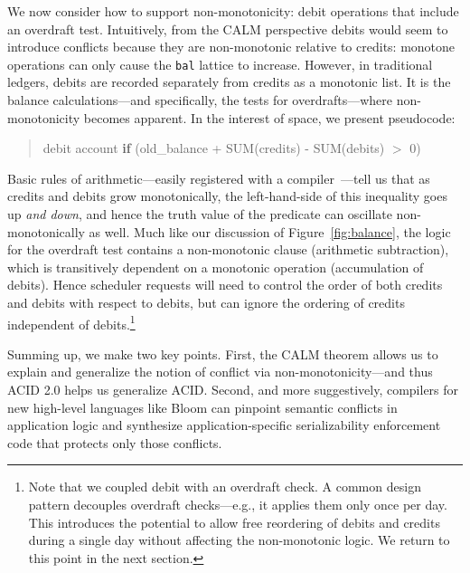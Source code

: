 \documentclass{sig-alternate}
\begin{document}
We now consider how to support non-monotonicity: debit operations that include an overdraft test. 
Intuitively, from the CALM perspective debits would seem to introduce conflicts because they are 
non-monotonic relative to credits: monotone operations can only cause the
\texttt{bal} lattice to increase. However, in traditional ledgers, debits are recorded separately from credits as a monotonic list.  It is the balance calculations---and specifically, the tests for overdrafts---where non-monotonicity becomes apparent.  In the interest of space, we present pseudocode:
\begin{quote}
	\begin{scriptsize}
 	\textsf{debit account \textbf{if} (old\_balance + SUM(credits) - SUM(debits) $>$ 0)}
	\end{scriptsize}
\end{quote}
Basic rules of arithmetic---easily registered with a compiler~\cite{Conway2012}---tell us that as credits and debits grow monotonically, the left-hand-side of this inequality goes up {\em and down}, and hence the truth value of the predicate can oscillate non-monotonically as well.  Much like our discussion of Figure~\ref{fig:balance}, the logic for the overdraft test contains a non-monotonic clause (arithmetic subtraction), which is transitively dependent on a monotonic operation (accumulation of debits).  Hence scheduler requests will need to control the order of both credits and debits with respect to debits, but can ignore the ordering of credits independent of debits.\footnote{Note that we coupled debit with an overdraft check.  A common design pattern decouples overdraft checks---e.g., it applies them only once per day.  This introduces the potential to allow free reordering of debits and credits during a single day without affecting the non-monotonic logic.  We return to this point in the next section.}

Summing up, we make two key points.  First, the CALM theorem allows us to explain and generalize the notion of conflict via non-monotonicity---and thus ACID 2.0 helps us generalize ACID.  Second, and more suggestively, compilers for new high-level languages like Bloom can pinpoint semantic conflicts in application logic and synthesize application-specific serializability enforcement code that protects only those conflicts.
\end{document}
